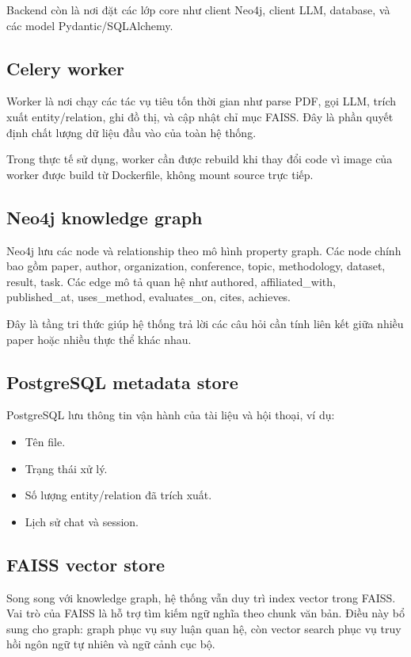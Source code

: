 \documentclass[12pt,a4paper]{article}
\begin{document}
Backend còn là nơi đặt các lớp core như client Neo4j, client LLM, database, và các model Pydantic/SQLAlchemy.

\subsection{Celery worker}
Worker là nơi chạy các tác vụ tiêu tốn thời gian như parse PDF, gọi LLM, trích xuất entity/relation, ghi đồ thị, và cập nhật chỉ mục FAISS. Đây là phần quyết định chất lượng dữ liệu đầu vào của toàn hệ thống.

Trong thực tế sử dụng, worker cần được rebuild khi thay đổi code vì image của worker được build từ Dockerfile, không mount source trực tiếp.

\subsection{Neo4j knowledge graph}
Neo4j lưu các node và relationship theo mô hình property graph. Các node chính bao gồm paper, author, organization, conference, topic, methodology, dataset, result, task. Các edge mô tả quan hệ như authored, affiliated_with, published_at, uses_method, evaluates_on, cites, achieves.

Đây là tầng tri thức giúp hệ thống trả lời các câu hỏi cần tính liên kết giữa nhiều paper hoặc nhiều thực thể khác nhau.

\subsection{PostgreSQL metadata store}
PostgreSQL lưu thông tin vận hành của tài liệu và hội thoại, ví dụ:
\begin{itemize}[leftmargin=1.6em]
  \item Tên file.
  \item Trạng thái xử lý.
  \item Số lượng entity/relation đã trích xuất.
  \item Lịch sử chat và session.
\end{itemize}

\subsection{FAISS vector store}
Song song với knowledge graph, hệ thống vẫn duy trì index vector trong FAISS. Vai trò của FAISS là hỗ trợ tìm kiếm ngữ nghĩa theo chunk văn bản. Điều này bổ sung cho graph: graph phục vụ suy luận quan hệ, còn vector search phục vụ truy hồi ngôn ngữ tự nhiên và ngữ cảnh cục bộ.
\end{document}
